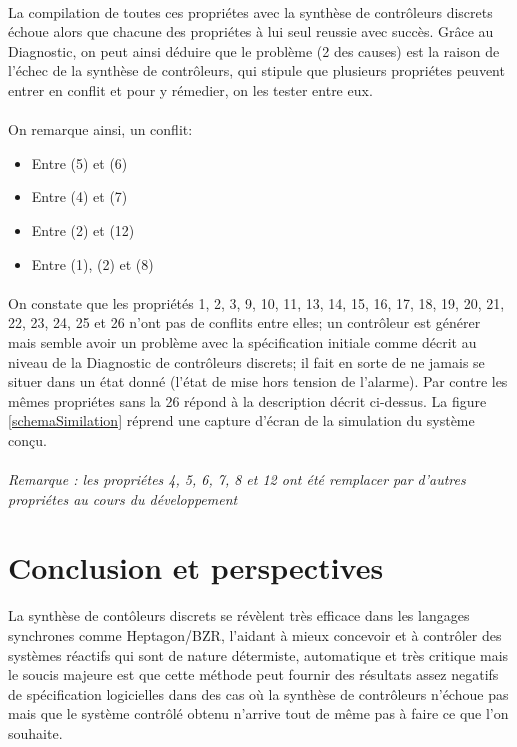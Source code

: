 \documentclass{svjour3}
\begin{document}
\paragraph{}
La compilation de toutes ces propriétes avec la synthèse de contrôleurs discrets échoue alors que chacune des propriétes à lui seul reussie avec succès. Grâce au
Diagnostic, on peut ainsi déduire que le problème (2 des causes) est la raison de l'échec de la synthèse de contrôleurs, qui stipule que plusieurs 
propriétes peuvent entrer en conflit et pour y rémedier, on les tester entre eux.
\paragraph{}
On remarque ainsi, un conflit:
\begin{itemize}
 \item Entre (5) et (6) 
 \item Entre (4) et (7) 
 \item Entre (2) et (12)
 \item Entre (1), (2) et (8)
\end{itemize}
\paragraph{}
On constate que les propriétés 1, 2, 3, 9, 10, 11, 13, 14, 15, 16, 17, 18, 19, 20, 21, 22, 23, 24, 25 et 26 n'ont pas de conflits entre elles; un contrôleur est générer mais semble avoir 
un problème avec la spécification initiale comme décrit au niveau de la Diagnostic de contrôleurs discrets; il fait en sorte de ne jamais se situer dans un état donné 
(l'état de mise hors tension de l'alarme). Par contre les mêmes propriétes sans la 26 répond à la description décrit ci-dessus. La figure \ref{schemaSimilation} réprend une capture d'écran de la simulation du système conçu.
\paragraph{}
\textit{Remarque : les propriétes 4, 5, 6, 7, 8 et 12 ont été remplacer par d'autres propriétes au cours du développement}
\section{Conclusion et perspectives}
La synthèse de contôleurs discrets se révèlent très efficace dans les langages synchrones comme Heptagon/BZR, l'aidant à mieux concevoir et à contrôler des systèmes 
réactifs qui sont de nature détermiste, automatique et très critique mais le soucis majeure est que cette méthode peut fournir des résultats assez negatifs de 
spécification logicielles dans des cas où la synthèse de contrôleurs n'échoue pas mais que le système contrôlé obtenu n'arrive tout de même pas à faire ce que l'on souhaite.
\end{document}
